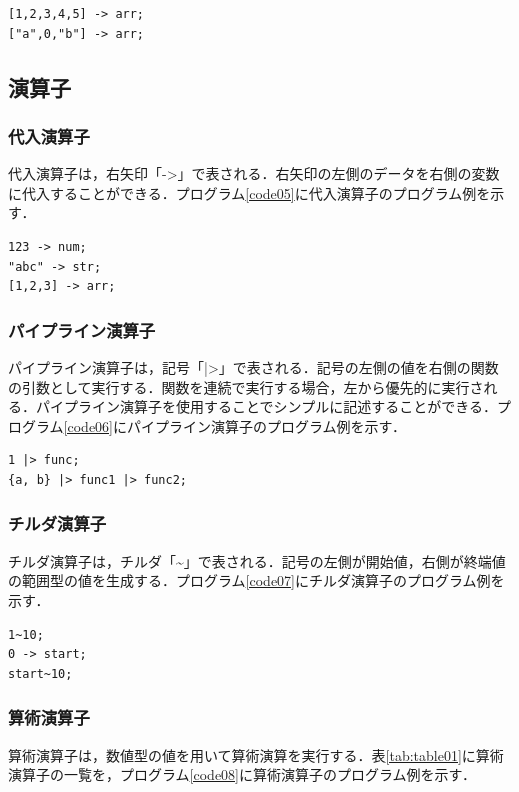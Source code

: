 \documentclass[10pt,a4j]{ltjsarticle}
\begin{document}
\begin{lstlisting}[caption=範囲型のプログラム例, label=code04]
[1,2,3,4,5] -> arr;
["a",0,"b"] -> arr;
\end{lstlisting}

\subsection{演算子}
\subsubsection{代入演算子}
代入演算子は，右矢印「->」で表される．右矢印の左側のデータを右側の変数に代入することができる．プログラム\ref{code05}に代入演算子のプログラム例を示す．

\begin{lstlisting}[caption=代入演算子のプログラム例, label=code05]
123 -> num;
"abc" -> str;
[1,2,3] -> arr;
\end{lstlisting}

\subsubsection{パイプライン演算子}
パイプライン演算子は，記号「|>」で表される．記号の左側の値を右側の関数の引数として実行する．関数を連続で実行する場合，左から優先的に実行される．パイプライン演算子を使用することでシンプルに記述することができる．プログラム\ref{code06}にパイプライン演算子のプログラム例を示す．

\begin{lstlisting}[caption=パイプライン演算子のプログラム例, label=code06]
1 |> func;
{a, b} |> func1 |> func2;
\end{lstlisting}

\subsubsection{チルダ演算子}
チルダ演算子は，チルダ「\textasciitilde」で表される．記号の左側が開始値，右側が終端値の範囲型の値を生成する．プログラム\ref{code07}にチルダ演算子のプログラム例を示す．

\begin{lstlisting}[caption=チルダ演算子のプログラム例, label=code07]
1~10;
0 -> start;
start~10;
\end{lstlisting}

\subsubsection{算術演算子}
算術演算子は，数値型の値を用いて算術演算を実行する．表\ref{tab:table01}に算術演算子の一覧を，プログラム\ref{code08}に算術演算子のプログラム例を示す．
\end{document}
